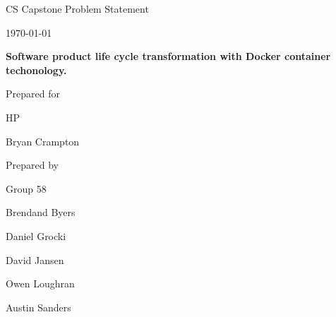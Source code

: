 \documentclass[onecolumn, draftclsnofoot,10pt, compsoc]{IEEEtran}
\def \CapstoneGroupNumber{		58}
\def \GroupMemberOne{			Brendand Byers}
\def \GroupMemberTwo{			Daniel Grocki}
\def \GroupMemberThree{			David Jansen}
\def \GroupMemberFour{			Owen Loughran}
\def \GroupMemberFive{			Austin Sanders}
\def \CapstoneProjectName{		Software product life cycle transformation with Docker container techonology.}
\def \CapstoneSponsorCompany{	HP}
\def \CapstoneSponsorPerson{		Bryan Crampton}
\def \DocType{		Problem Statement
				}
\newcommand{\NameSigPair}[1]{\par
\makebox[2.75in][r]{#1} \hfil 	\makebox[3.25in]{\makebox[2.25in]{\hrulefill} \hfill		\makebox[.75in]{\hrulefill}}
\par\vspace{-12pt} \textit{\tiny\noindent
\makebox[2.75in]{} \hfil		\makebox[3.25in]{\makebox[2.25in][r]{Signature} \hfill	\makebox[.75in][r]{Date}}}}
\renewcommand{\NameSigPair}[1]{#1}
\begin{document}
\begin{titlepage}
    \begin{singlespace}
        \hfill 
        \par\vspace{.2in}
        \centering
        \scshape{
            \huge CS Capstone \DocType \par
            {\large\today}\par
            \vspace{.5in}
            \textbf{\Huge\CapstoneProjectName}\par
            \vfill
            {\large Prepared for}\par
            \Huge \CapstoneSponsorCompany\par
            \vspace{5pt}
            {\Large\NameSigPair{\CapstoneSponsorPerson}\par}
            {\large Prepared by }\par
            Group\CapstoneGroupNumber\par
            \vspace{5pt}
            {\Large
                \NameSigPair{\GroupMemberOne}\par
                \NameSigPair{\GroupMemberTwo}\par
                \NameSigPair{\GroupMemberThree}\par
                \NameSigPair{\GroupMemberFour}\par
                \NameSigPair{\GroupMemberFive}\par
            }
            \vspace{20pt}
        }     
    \end{singlespace}
\end{titlepage}
\newpage
{}
\tableofcontents
\clearpage

\end{document}
